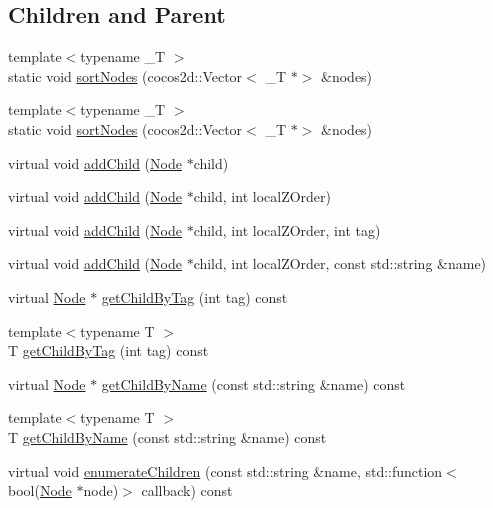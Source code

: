 \subsection*{Children and Parent}
\begin{DoxyCompactItemize}
\item 
{\footnotesize template$<$typename \+\_\+T $>$ }\\static void \hyperlink{classNode_a17a2149cbfe0819a11f3e109cc67645c}{sort\+Nodes} (cocos2d\+::\+Vector$<$ \+\_\+T $\ast$$>$ \&nodes)
\item 
{\footnotesize template$<$typename \+\_\+T $>$ }\\static void \hyperlink{classNode_a17a2149cbfe0819a11f3e109cc67645c}{sort\+Nodes} (cocos2d\+::\+Vector$<$ \+\_\+T $\ast$$>$ \&nodes)
\item 
virtual void \hyperlink{classNode_a132699398b350e83b548a5645e69beb0}{add\+Child} (\hyperlink{classNode}{Node} $\ast$child)
\item 
virtual void \hyperlink{classNode_ad0005bbb94623abd997ce7c3116e6212}{add\+Child} (\hyperlink{classNode}{Node} $\ast$child, int local\+Z\+Order)
\item 
virtual void \hyperlink{classNode_ac29dab4b296e96c5072545cf9bd94b90}{add\+Child} (\hyperlink{classNode}{Node} $\ast$child, int local\+Z\+Order, int tag)
\item 
virtual void \hyperlink{classNode_abed32867e81e7902c8155dca7d347a18}{add\+Child} (\hyperlink{classNode}{Node} $\ast$child, int local\+Z\+Order, const std\+::string \&name)
\item 
virtual \hyperlink{classNode}{Node} $\ast$ \hyperlink{classNode_a8eebd018aa7ebebb674d1649e1a79cac}{get\+Child\+By\+Tag} (int tag) const
\item 
{\footnotesize template$<$typename T $>$ }\\T \hyperlink{classNode_a093e82df91d1c2df7d55e5b1b319012b}{get\+Child\+By\+Tag} (int tag) const
\item 
virtual \hyperlink{classNode}{Node} $\ast$ \hyperlink{classNode_ac2f84f995c7d6581787abaa3b09c4518}{get\+Child\+By\+Name} (const std\+::string \&name) const
\item 
{\footnotesize template$<$typename T $>$ }\\T \hyperlink{classNode_abbd6d0f2c3d65db94ea75d16402f83a2}{get\+Child\+By\+Name} (const std\+::string \&name) const
\item 
virtual void \hyperlink{classNode_ada6f69bdf4cd0b241dc12935536f3dbe}{enumerate\+Children} (const std\+::string \&name, std\+::function$<$ bool(\hyperlink{classNode}{Node} $\ast$node)$>$ callback) const

\end{DoxyCompactItemize}
